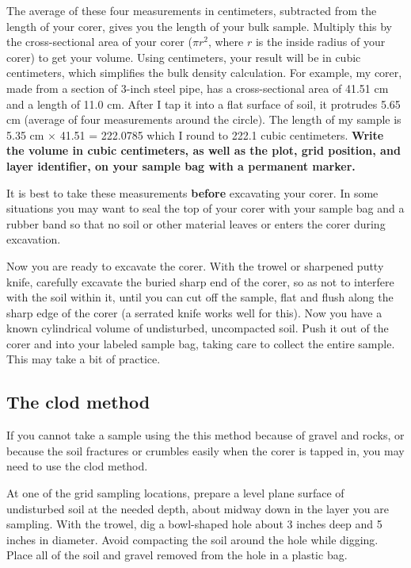 \documentclass[11pt,letterpaper,oneside,onecolumn]{memoir}
\begin{document}
The average of these four measurements in centimeters, subtracted from the length of your corer, gives you the length of your bulk sample. Multiply this by the cross-sectional area of your corer ($\pi r^{2}$, where $r$ is the inside radius of your corer) to get your volume. Using centimeters, your result will be in cubic centimeters, which simplifies the bulk density calculation. For example, my corer, made from a section of 3-inch steel pipe, has a cross-sectional area of 41.51 cm and a length of 11.0 cm. After I tap it into a flat surface of soil, it protrudes 5.65 cm (average of four measurements around the circle). The length of my sample is 5.35 cm $\times$ 41.51 = 222.0785 which I round to 222.1 cubic centimeters. \textbf{Write the volume in cubic centimeters, as well as the plot, grid position, and layer identifier, on your sample bag with a permanent marker.}

It is best to take these measurements \textbf{before} excavating your corer. In some situations you may want to seal the top of your corer with your sample bag and a rubber band so that no soil or other material leaves or enters the corer during excavation.

Now you are ready to excavate the corer. With the trowel or sharpened putty knife, carefully excavate the buried sharp end of the corer, so as not to interfere with the soil within it, until you can cut off the sample, flat and flush along the sharp edge of the corer (a serrated knife works well for this). Now you have a known cylindrical volume of undisturbed, uncompacted soil. Push it out of the corer and into your labeled sample bag, taking care to collect the entire sample. This may take a bit of practice.

\subsection{The clod method}

If you cannot take a sample using the this method because of gravel and rocks, or because the soil fractures or crumbles easily when the corer is tapped in, you may need to use the clod method.

At one of the grid sampling locations, prepare a level plane surface of undisturbed soil at the needed depth, about midway down in the layer you are sampling. With the trowel, dig a bowl-shaped hole about 3 inches deep and 5 inches in diameter. Avoid compacting the soil around the hole while digging. Place all of the soil and gravel removed from the hole in a plastic bag.
\end{document}
